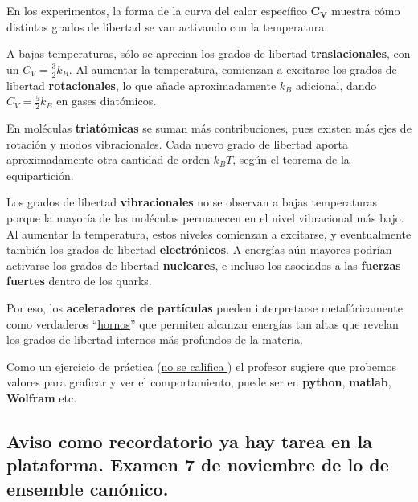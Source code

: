 \documentclass{article}
\begin{document}
En los experimentos, la forma de la curva del calor específico $\boldsymbol{C_{V}}$ muestra cómo distintos grados de libertad se van activando con la temperatura.

A bajas temperaturas, sólo se aprecian los grados de libertad \textbf{traslacionales}, con un $C_{V} = \tfrac{3}{2}k_{B}$.  
Al aumentar la temperatura, comienzan a excitarse los grados de libertad \textbf{rotacionales}, lo que añade aproximadamente $k_{B}$ adicional, dando $C_{V} = \tfrac{5}{2}k_{B}$ en gases diatómicos.

En moléculas \textbf{triatómicas} se suman más contribuciones, pues existen más ejes de rotación y modos vibracionales.  
Cada nuevo grado de libertad aporta aproximadamente otra cantidad de orden $k_{B}T$, según el teorema de la equipartición.

Los grados de libertad \textbf{vibracionales} no se observan a bajas temperaturas porque la mayoría de las moléculas permanecen en el nivel vibracional más bajo.  
Al aumentar la temperatura, estos niveles comienzan a excitarse, y eventualmente también los grados de libertad \textbf{electrónicos}.  
A energías aún mayores podrían activarse los grados de libertad \textbf{nucleares}, e incluso los asociados a las \textbf{fuerzas fuertes} dentro de los quarks.

Por eso, los \textbf{aceleradores de partículas} pueden interpretarse metafóricamente como verdaderos “\underline{hornos}” que permiten alcanzar energías tan altas que revelan los grados de libertad internos más profundos de la materia.

Como un ejercicio de práctica (\underline{no se califica	}) el profesor sugiere que probemos valores para graficar y ver el comportamiento, puede ser en \textcolor{Sun}{\textbf{python}}, \textcolor{Logan}{\textbf{matlab}}, \textcolor{Tarawera}{\textbf{Wolfram}} etc. 

\subsection{Aviso como recordatorio ya hay tarea en la plataforma. Examen 7 de noviembre de lo de ensemble canónico.}
\end{document}

